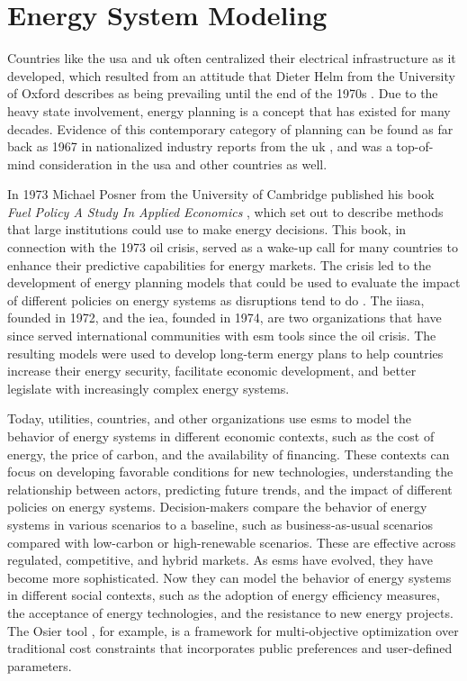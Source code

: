 \section{Energy System Modeling}
\label{sec:esm}

Countries like the \gls{usa} and \gls{uk} often centralized their electrical
infrastructure as it developed, which resulted from an attitude that Dieter
Helm from the University of Oxford describes as being prevailing until the end
of the 1970s \cite{helm_energy_2002}. Due to the heavy state involvement,
energy planning is a concept that has existed for many decades. Evidence of
this contemporary category of planning can be found as far back as 1967 in
nationalized industry reports from the \gls{uk}
\cite{treasury_nationalised_1967}, and was a top-of-mind consideration in the
\gls{usa} and other countries as well.

In 1973 Michael Posner from the University of Cambridge published his book
\textit{Fuel Policy A Study In Applied Economics} \cite{posner_fuel_1973},
which set out to describe methods that large institutions could use to make
energy decisions. This book, in connection with the 1973 oil crisis, served as
a wake-up call for many countries to enhance their predictive capabilities for
energy markets. The crisis led to the development of energy planning models
that could be used to evaluate the impact of different policies on energy
systems as disruptions tend to do \cite{plazas_disrupt_2022}. The \gls{iiasa},
founded in 1972, and the \gls{iea}, founded in 1974, are two organizations that
have since served international communities with \gls{esm} tools since the oil
crisis. The resulting models were used to develop long-term energy plans to
help countries increase their energy security, facilitate economic development,
and better legislate with increasingly complex energy systems.

Today, utilities, countries, and other organizations use \glspl{esm} to model
the behavior of energy systems in different economic contexts, such as the cost
of energy, the price of carbon, and the availability of financing. These
contexts can focus on developing favorable conditions for new technologies,
understanding the relationship between actors, predicting future trends, and
the impact of different policies on energy systems. Decision-makers compare the
behavior of energy systems in various scenarios to a baseline, such as
business-as-usual scenarios compared with low-carbon or high-renewable
scenarios. These are effective across regulated, competitive, and hybrid
markets. As \glspl{esm} have evolved, they have become more sophisticated. Now
they can model the behavior of energy systems in different social contexts,
such as the adoption of energy efficiency measures, the acceptance of energy
technologies, and the resistance to new energy projects. The Osier tool
\cite{Dotson_osier}, for example, is a
framework for multi-objective optimization over traditional cost constraints
that incorporates public preferences and user-defined parameters.

